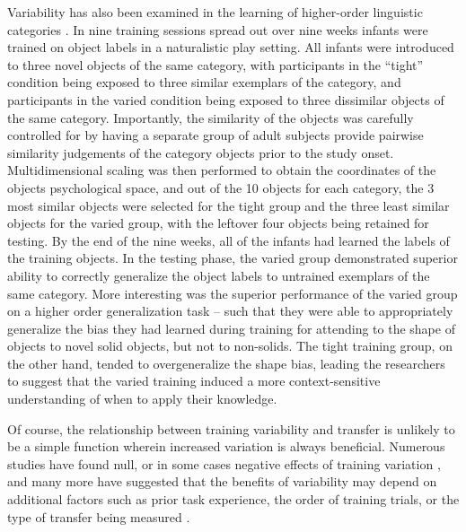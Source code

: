 \documentclass[
  12pt,
  letterpaper,
]{article}
\begin{document}
Variability has also been examined in the learning of higher-order
linguistic categories \autocite{perryLearnLocallyThink2010}. In nine
training sessions spread out over nine weeks infants were trained on
object labels in a naturalistic play setting. All infants were
introduced to three novel objects of the same category, with
participants in the ``tight'' condition being exposed to three similar
exemplars of the category, and participants in the varied condition
being exposed to three dissimilar objects of the same category.
Importantly, the similarity of the objects was carefully controlled for
by having a separate group of adult subjects provide pairwise similarity
judgements of the category objects prior to the study onset.
Multidimensional scaling was then performed to obtain the coordinates of
the objects psychological space, and out of the 10 objects for each
category, the 3 most similar objects were selected for the tight group
and the three least similar objects for the varied group, with the
leftover four objects being retained for testing. By the end of the nine
weeks, all of the infants had learned the labels of the training
objects. In the testing phase, the varied group demonstrated superior
ability to correctly generalize the object labels to untrained exemplars
of the same category. More interesting was the superior performance of
the varied group on a higher order generalization task -- such that they
were able to appropriately generalize the bias they had learned during
training for attending to the shape of objects to novel solid objects,
but not to non-solids. The tight training group, on the other hand,
tended to overgeneralize the shape bias, leading the researchers to
suggest that the varied training induced a more context-sensitive
understanding of when to apply their knowledge.

Of course, the relationship between training variability and transfer is
unlikely to be a simple function wherein increased variation is always
beneficial. Numerous studies have found null, or in some cases negative
effects of training variation
\autocite{deloshExtrapolationSineQua1997,sinkeviciuteRoleInputVariability2019,wrisbergVariabilityPracticeHypothesis1987,vanrossumSchmidtSchemaTheory1990},
and many more have suggested that the benefits of variability may depend
on additional factors such as prior task experience, the order of
training trials, or the type of transfer being measured
\autocite{bernikerEffectsTrainingBreadth2014,braithwaiteEffectsVariationPrior2015,hahnEffectsCategoryDiversity2005,lavanEffectsHighVariability2019,northEffectConsistentVaried2019,sadakataIndividualAptitudeMandarin2014,zamanPerceptualVariabilityImplications2021}.
\end{document}
